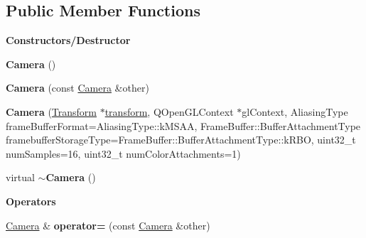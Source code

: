 \subsection*{Public Member Functions}
\begin{Indent}\textbf{ Constructors/\+Destructor}\par
\begin{DoxyCompactItemize}
\item 
\mbox{\label{classrev_1_1_camera_a874590498d4368c390414ce16d6e1eee}} 
{\bfseries Camera} ()
\item 
\mbox{\label{classrev_1_1_camera_a114ca6768e27205d3e0edf1d6bef1796}} 
{\bfseries Camera} (const \mbox{\hyperlink{classrev_1_1_camera}{Camera}} \&other)
\item 
\mbox{\label{classrev_1_1_camera_a14e74afb4ae372216d9a43c61107b8ca}} 
{\bfseries Camera} (\mbox{\hyperlink{classrev_1_1_transform}{Transform}} $\ast$\mbox{\hyperlink{classrev_1_1_camera_a8d8ebfe2a7d4538910bc3d5ff934a52b}{transform}}, Q\+Open\+G\+L\+Context $\ast$gl\+Context, Aliasing\+Type frame\+Buffer\+Format=Aliasing\+Type\+::k\+M\+S\+AA, Frame\+Buffer\+::\+Buffer\+Attachment\+Type framebuffer\+Storage\+Type=Frame\+Buffer\+::\+Buffer\+Attachment\+Type\+::k\+R\+BO, uint32\+\_\+t num\+Samples=16, uint32\+\_\+t num\+Color\+Attachments=1)
\item 
\mbox{\label{classrev_1_1_camera_aa32de82ce93147f40725eb38196a32ed}} 
virtual {\bfseries $\sim$\+Camera} ()
\end{DoxyCompactItemize}
\end{Indent}
\begin{Indent}\textbf{ Operators}\par
\begin{DoxyCompactItemize}
\item 
\mbox{\label{classrev_1_1_camera_a59231cc2443861f226c3216852cfc8bd}} 
\mbox{\hyperlink{classrev_1_1_camera}{Camera}} \& {\bfseries operator=} (const \mbox{\hyperlink{classrev_1_1_camera}{Camera}} \&other)
\end{DoxyCompactItemize}
\end{Indent}
